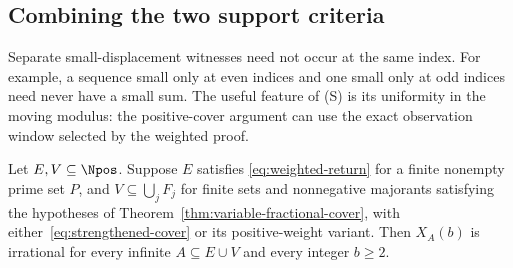 \documentclass[11pt]{article}
\begin{document}
\subsection{Combining the two support criteria}
Separate small-displacement witnesses need not occur at the same index.
For example, a sequence small only at even indices and one small only at odd
indices need never have a small sum.  The useful feature of (S) is its
uniformity in the moving modulus: the positive-cover argument can use the
exact observation window selected by the weighted proof.
\begin{theorem}\label{res:mixed-supports}
Let $E,V\subseteq\Npos$.  Suppose $E$ satisfies
\eqref{eq:weighted-return} for a finite nonempty prime set $P$, and
$V\subseteq\bigcup_jF_j$ for finite sets and nonnegative majorants
satisfying the hypotheses of Theorem~\ref{thm:variable-fractional-cover},
with either~\eqref{eq:strengthened-cover} or its positive-weight variant.
Then $X_A(b)$ is irrational for every
infinite $A\subseteq E\cup V$ and every integer $b\ge2$.
\end{theorem}
\end{document}

